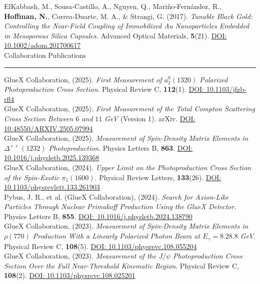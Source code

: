 \documentclass[letterpaper,11pt,oneside]{article}
\newcommand{\sectionheader}[1]{%
{\Large{#1}}
\vspace{2ex}
\hrule
\vspace{2ex}
}
\begin{document}
ElKabbash, M., Sousa‐Castillo, A., Nguyen, Q., Mariño‐Fernández, R., \textbf{Hoffman, N.}, Correa‐Duarte, M. A., \& Strangi, G. (2017). \textit{Tunable Black Gold: Controlling the Near‐Field Coupling of Immobilized Au Nanoparticles Embedded in Mesoporous Silica Capsules.} Advanced Optical Materials, \textbf{5}(21). \href{https://doi.org/10.1002/adom.201700617}{DOI: 10.1002/adom.201700617}\\

\sectionheader{Collaboration Publications}
GlueX Collaboration, (2025). \textit{First Measurement of $a_2^0(1320)$ Polarized Photoproduction Cross Section}. Physical Review C, \textbf{112}(1). \href{https://doi.org/10.1103/jfzb-rfl4}{DOI: 10.1103/jfzb-rfl4}\\

GlueX Collaboration, (2025). \textit{First Measurement of the Total Compton Scattering Cross Section Between $6$ and $11$ GeV} (Version 1). arXiv. \href{https://doi.org/10.48550/ARXIV.2505.07994}{DOI: 10.48550/ARXIV.2505.07994}\\

GlueX Collaboration, (2025). \textit{Measurement of Spin-Density Matrix Elements in $\Delta^{++}(1232)$ Photoproduction}. Physics Letters B, \textbf{863}. \href{https://doi.org/10.1016/j.physletb.2025.139368}{DOI: 10.1016/j.physletb.2025.139368}\\

GlueX Collaboration, (2024). \textit{Upper Limit on the Photoproduction Cross Section of the Spin-Exotic $\pi_1(1600)$}. Physical Review Letters, \textbf{133}(26). \href{https://doi.org/10.1103/physrevlett.133.261903}{DOI: 10.1103/physrevlett.133.261903}\\

Pybus, J. R., et al. (GlueX Collaboration), (2024). \textit{Search for Axion-Like Particles Through Nuclear Primakoff Production Using the GlueX Detector}. Physics Letters B, \textbf{855}. \href{https://doi.org/10.1016/j.physletb.2024.138790}{DOI:\allowbreak\ 10.1016/\allowbreak j.physletb.2024.138790}\\

GlueX Collaboration, (2023). \textit{Measurement of Spin-Density Matrix Elements in $\rho(770)$ Production With a Linearly Polarized Photon Beam at $E_{\gamma} = 8.2$\textemdash $8.8$ GeV}. Physical Review C, \textbf{108}(5). \href{https://doi.org/10.1103/physrevc.108.055204}{DOI: 10.1103/physrevc.108.055204}\\

GlueX Collaboration, (2023). \textit{Measurement of the $J/\psi$ Photoproduction Cross Section Over the Full Near-Threshold Kinematic Region}. Physical Review C, \textbf{108}(2). \href{https://doi.org/10.1103/physrevc.108.025201}{DOI: 10.1103/physrevc.108.025201}\\
\end{document}
